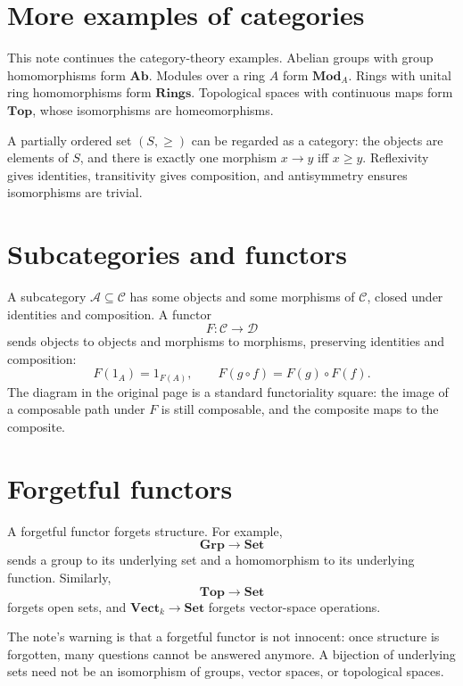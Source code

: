 
\section{More examples of categories}

This note continues the category-theory examples.  Abelian groups with group homomorphisms form \(\mathbf{Ab}\).  Modules over a ring \(A\) form \(\mathbf{Mod}_A\).  Rings with unital ring homomorphisms form \(\mathbf{Rings}\).  Topological spaces with continuous maps form \(\mathbf{Top}\), whose isomorphisms are homeomorphisms.

A partially ordered set \((S,\ge)\) can be regarded as a category: the objects are elements of \(S\), and there is exactly one morphism \(x\to y\) iff \(x\ge y\).  Reflexivity gives identities, transitivity gives composition, and antisymmetry ensures isomorphisms are trivial.

\section{Subcategories and functors}

A subcategory \(\mathcal A\subseteq\mathcal C\) has some objects and some morphisms of \(\mathcal C\), closed under identities and composition.  A functor
\[
  F:\mathcal C\to\mathcal D
\]
sends objects to objects and morphisms to morphisms, preserving identities and composition:
\[
  F(1_A)=1_{F(A)},\qquad F(g\circ f)=F(g)\circ F(f).
\]
The diagram in the original page is a standard functoriality square: the image of a composable path under \(F\) is still composable, and the composite maps to the composite.

\section{Forgetful functors}

A forgetful functor forgets structure.  For example,
\[
  \mathbf{Grp}\to\mathbf{Set}
\]
sends a group to its underlying set and a homomorphism to its underlying function.  Similarly,
\[
  \mathbf{Top}\to\mathbf{Set}
\]
forgets open sets, and \(\mathbf{Vect}_k\to\mathbf{Set}\) forgets vector-space operations.

The note's warning is that a forgetful functor is not innocent: once structure is forgotten, many questions cannot be answered anymore.  A bijection of underlying sets need not be an isomorphism of groups, vector spaces, or topological spaces.

